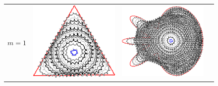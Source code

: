 \begin{figure}
\center
\begin{tabular}{p{3em}ccc}
$m=1$ & \includegraphics[scale=0.25]{figures/chapter6/level-effect/triangle/improve/len_pen0/radius-5/level1/summary.pdf} &
\includegraphics[scale=0.25]{figures/chapter6/level-effect/flower/improve/len_pen0/radius-5/level1/summary.pdf} &

\end{tabular}
\end{figure}
